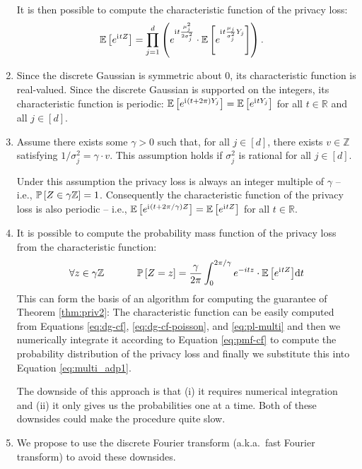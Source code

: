 \documentclass{jpc}
\newcommand{\ii}{\mathrm{i}\mkern1mu}
\newcommand{\ex}[2]{{\ifx&#1& \mathbb{E} \else
\underset{#1}{\mathbb{E}} \fi \left[#2\right]}}
\newcommand{\pr}[2]{{\ifx&#1& \mathbb{P} \else
\underset{#1}{\mathbb{P}} \fi \left[#2\right]}}
\newcommand{\dx}[1][x]{\mathrm{d}#1}
\newcommand{\Z}{\mathbb{Z}}
\newcommand{\R}{\mathbb{R}}
\begin{document}
\begin{enumerate}
    It is then possible to compute the characteristic function of the privacy loss:
    \begin{align}
        \ex{}{e^{\ii{}tZ}} &= \prod_{j=1}^d \left( e^{\ii{}t \frac{\mu_j^2}{2\sigma_j^2}}\cdot \ex{}{e^{\ii{} t \frac{\mu_j}{\sigma_j^2} Y_j}} \right).\label{eq:pl-multi}
    \end{align}
    
    \item Since the discrete Gaussian is symmetric about $0$, its characteristic function is real-valued. Since the discrete Gaussian is supported on the integers, its characteristic function is periodic: $\ex{}{e^{\ii{}(t+2\pi)Y_j}} = \ex{}{e^{\ii{}tY_j}}$ for all $t \in \R$ and all $j \in [d]$.
    
    \item Assume there exists some $\gamma>0$ such that, for all $j \in [d]$, there exists $v \in \Z$ satisfying $1/\sigma_j^2 = \gamma \cdot v$. 
    This assumption holds if $\sigma_j^2$ is rational for all $j \in [d]$.
    
    Under this assumption the privacy loss is always an integer multiple of $\gamma$ -- i.e., $\pr{}{Z \in \gamma \Z}=1$.
    Consequently the characteristic function of the privacy loss is also periodic -- i.e., $\ex{}{e^{\ii{}(t+2\pi/\gamma)Z}} = \ex{}{e^{\ii{}tZ}}$ for all $t \in \R$.
    
    \item It is possible to compute the probability mass function of the privacy loss from the characteristic function:
    \begin{equation}
        \forall z \in \gamma \Z ~~~~~~~~~~ \pr{}{Z=z} = \frac{\gamma}{2\pi} \int_0^{2\pi/\gamma} e^{-itz} \cdot \ex{}{e^{\ii{}tZ}} \dx[t] \label{eq:pmf-cf}
    \end{equation}
    This can form the basis of an algorithm for computing the guarantee of Theorem \ref{thm:priv2}: The characteristic function can be easily computed from Equations \ref{eq:dg-cf}, \ref{eq:dg-cf-poisson}, and \ref{eq:pl-multi} and then we numerically integrate it according to Equation \ref{eq:pmf-cf} to compute the probability distribution of the privacy loss and finally we substitute this into Equation \ref{eq:multi_adp1}.
    
    The downside of this approach is that (i) it requires numerical integration and (ii) it only gives us the probabilities one at a time. Both of these downsides could make the procedure quite slow.
    
    \item We propose to use the discrete Fourier transform (a.k.a.~fast Fourier transform) to avoid these downsides.
    

\end{enumerate}
\end{document}
